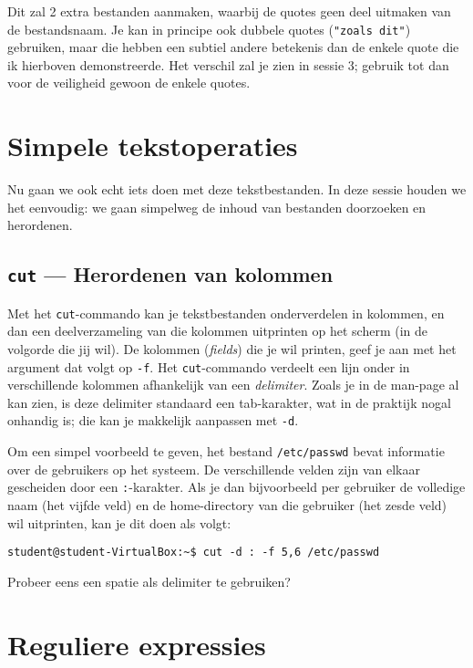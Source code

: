 \documentclass[a4paper,twoside,openany]{memoir}
\begin{document}
Dit zal 2 extra bestanden aanmaken, waarbij de quotes geen deel uitmaken van de
bestandsnaam. Je kan in principe ook dubbele quotes (\verb!"zoals dit"!)
gebruiken, maar die hebben een subtiel andere betekenis dan de enkele quote die
ik hierboven demonstreerde. Het verschil zal je zien in sessie 3; gebruik tot
dan voor de veiligheid gewoon de enkele quotes.

\chapter{Simpele tekstoperaties}

Nu gaan we ook echt iets doen met deze tekstbestanden. In deze sessie houden we
het eenvoudig: we gaan simpelweg de inhoud van bestanden doorzoeken en
herordenen.

\section{\texttt{cut} --- Herordenen van kolommen}

Met het \verb!cut!-commando kan je tekstbestanden onderverdelen in kolommen, en
dan een deelverzameling van die kolommen uitprinten op het scherm (in de
volgorde die jij wil). De kolommen (\emph{fields}) die je wil printen, geef je
aan met het argument dat volgt op \verb!-f!. Het \verb!cut!-commando verdeelt
een lijn onder in verschillende kolommen afhankelijk van een \emph{delimiter}.
Zoals je in de man-page al kan zien, is deze delimiter standaard een
tab-karakter, wat in de praktijk nogal onhandig is; die kan je makkelijk
aanpassen met \verb!-d!.

Om een simpel voorbeeld te geven, het bestand \verb!/etc/passwd! bevat
informatie over de gebruikers op het systeem. De verschillende velden zijn van
elkaar gescheiden door een \verb!:!-karakter. Als je dan bijvoorbeeld per
gebruiker de volledige naam (het vijfde veld) en de home-directory van die
gebruiker (het zesde veld) wil uitprinten, kan je dit doen als volgt:

\begin{verbatim}
student@student-VirtualBox:~$ cut -d : -f 5,6 /etc/passwd
\end{verbatim}

Probeer eens een spatie als delimiter te gebruiken?

\chapter{Reguliere expressies}
\label{regexp_basic}
\end{document}
